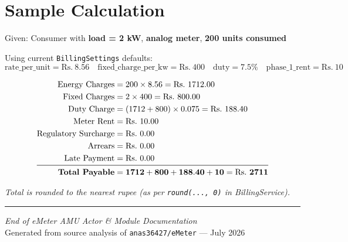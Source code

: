 \documentclass[12pt, a4paper]{report}
\begin{document}
\section*{Sample Calculation}

Given: Consumer with \textbf{load = 2 kW}, \textbf{analog meter}, \textbf{200 units consumed}

\vspace{0.5em}
Using current \texttt{BillingSettings} defaults:
\[
\text{rate\_per\_unit} = \text{Rs.}\ 8.56 \quad
\text{fixed\_charge\_per\_kw} = \text{Rs.}\ 400 \quad
\text{duty} = 7.5\% \quad
\text{phase\_1\_rent} = \text{Rs.}\ 10
\]

\begin{align*}
\text{Energy Charges} &= 200 \times 8.56 = \text{Rs.}\ 1712.00 \\
\text{Fixed Charges} &= 2 \times 400 = \text{Rs.}\ 800.00 \\
\text{Duty Charge} &= (1712 + 800) \times 0.075 = \text{Rs.}\ 188.40 \\
\text{Meter Rent} &= \text{Rs.}\ 10.00 \\
\text{Regulatory Surcharge} &= \text{Rs.}\ 0.00 \\
\text{Arrears} &= \text{Rs.}\ 0.00 \\
\text{Late Payment} &= \text{Rs.}\ 0.00 \\
\midrule
\textbf{Total Payable} &= \mathbf{1712 + 800 + 188.40 + 10 = \text{Rs.}\ 2711}
\end{align*}

\textit{Total is rounded to the nearest rupee (as per \texttt{round(..., 0)} in BillingService).}

\vspace{2em}
\hrule
\vspace{1em}

\begin{center}
\textit{End of eMeter AMU Actor \& Module Documentation}\\[0.3cm]
{\small Generated from source analysis of \texttt{anas36427/eMeter} — July 2026}
\end{center}
\end{document}

